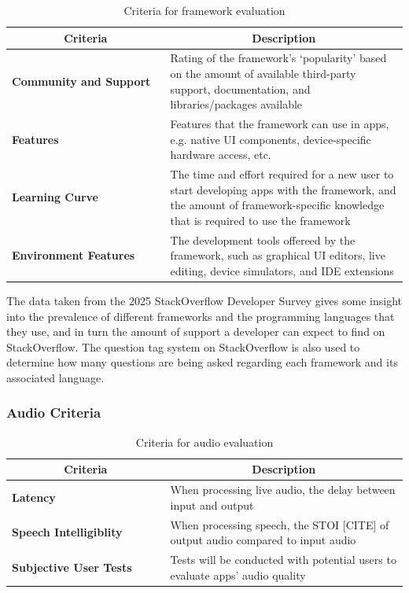 \begin{table}[htbp]
	\caption{Criteria for framework evaluation}\label{tab:frameworks}
	\begin{center}
		\begin{tabular}[c]{|p{0.4\linewidth}|p{0.6\linewidth}|}
			\hline
			\multicolumn{1}{|c|}{\textbf{Criteria}} & 
			\multicolumn{1}{|c|}{\textbf{Description}} \\
			\hline
			\textbf{Community and Support} & Rating of the framework's `popularity' based on the amount of available third-party support, documentation, and libraries/packages available \\
			\hline
			\textbf{Features} & Features that the framework can use in apps, e.g. native UI components, device-specific hardware access, etc.\\
			\hline
			\textbf{Learning Curve} & The time and effort required for a new user to start developing apps with the framework, and the amount of framework-specific knowledge that is required to use the framework\\
			\hline
			\textbf{Environment Features} & The development tools offereed by the framework, such as graphical UI editors, live editing, device simulators, and IDE extensions\\
			
			\hline
		\end{tabular}
	\end{center}
\end{table}

The data taken from the 2025 StackOverflow Developer Survey gives some insight into the prevalence of different frameworks and the programming languages that they use, and in turn the amount of support a developer can expect to find on StackOverflow.
The question tag system on StackOverflow is also used to determine how many questions are being asked regarding each framework and its associated language.

\subsubsection{Audio Criteria}

\begin{table}[htbp]
	\caption{Criteria for audio evaluation}\label{tab:audio criteria}
	\begin{center}
		\begin{tabular}[c]{|p{0.4\linewidth}|p{0.6\linewidth}|}
			\hline
			\multicolumn{1}{|c|}{\textbf{Criteria}} & 
			\multicolumn{1}{|c|}{\textbf{Description}} \\
			\hline
			\textbf{Latency} & When processing live audio, the delay between input and output \\
			\hline
			\textbf{Speech Intelligiblity} & When processing speech, the STOI [CITE] of output audio compared to input audio\\
			\hline
			\textbf{Subjective User Tests} & Tests will be conducted with potential users to evaluate apps' audio quality\\
			\hline
		\end{tabular}
	\end{center}
\end{table}

